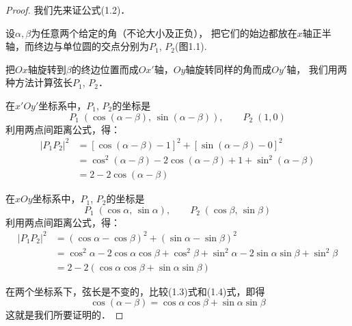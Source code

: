 \begin{proof}
我们先来证公式(1.2)．

设$\alpha,\beta$为任意两个给定的角（不论大小及正负），
把它们的始边都放在$x$轴正半轴，而终边与单位圆的交点分别为$P_1$, $P_2$(图1.1).

\begin{figure}[htp]
    \centering
    \caption{}
\end{figure}

把$Ox$轴旋转到$\beta$的终边位置而成$Ox'$轴，$Oy$轴旋转同样的角而成$Oy'$轴，
我们用两种方法计算弦长$P_1$, $P_2$．

在$x'Oy'$坐标系中，$P_1$, $P_2$的坐标是
\[P_1\; \left(\cos(\alpha-\beta),\, \sin(\alpha-\beta)\right),\qquad P_2\; (1,0) \]
利用两点间距离公式，得：
\begin{equation}
\begin{split}
|P_1P_2|^2 &=\left[\cos(\alpha-\beta)-1\right]^2+\left[\sin(\alpha-\beta)-0\right]^2\\
&=\cos^2(\alpha-\beta)-2\cos(\alpha-\beta)+1+\sin^2(\alpha-\beta)\\
&=2-2\cos (\alpha-\beta)
\end{split}
\end{equation}

在$xOy$坐标系中，$P_1$, $P_2$的坐标是
\[P_1\;(\cos\alpha,\, \sin\alpha),\qquad  P_2\; (\cos\beta,\, \sin\beta)\]
利用两点间距离公式，得：
\begin{equation}
    \begin{split}
    |P_1P_2|^2 &=(\cos\alpha-\cos\beta)^2+(\sin\alpha-\sin\beta)^2\\
    &=\cos^2\alpha-2\cos\alpha\cos\beta+\cos^2\beta +\sin^2\alpha-2\sin\alpha\sin\beta+\sin^2\beta\\
    &=2-2(\cos\alpha\cos\beta+\sin\alpha\sin\beta)
    \end{split}
    \end{equation}

    在两个坐标系下，弦长是不变的，比较(1.3)式和(1.4)式，即得
   \[ \cos (\alpha-\beta) =\cos\alpha\cos\beta+\sin\alpha\sin\beta\]
    这就是我们所要证明的．
\end{proof}

